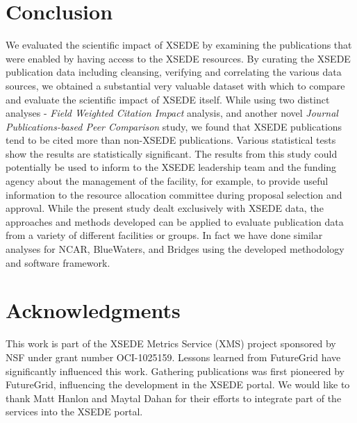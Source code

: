 \documentclass{sig-alternate}
\begin{document}
\section{Conclusion} \label{S:conclusion}

We evaluated the scientific impact of XSEDE by examining the
publications that were enabled by having access to the XSEDE
resources. By curating the XSEDE publication data including cleansing,
verifying and correlating the various data sources, we obtained a
substantial very valuable dataset with which to compare and evaluate
the scientific impact of XSEDE itself.  While using two distinct
analyses - \emph{Field Weighted Citation Impact} analysis, and another novel
\emph{Journal Publications-based Peer Comparison} study, we found that XSEDE
publications tend to be cited more than non-XSEDE publications.
Various statistical tests show the results are statistically
significant.  The results from this study could potentially be used to
inform to the XSEDE leadership team and the funding agency about the
management of the facility, for example, to provide useful information
to the resource allocation committee during proposal selection and
approval.  While the present study dealt exclusively with XSEDE data,
the approaches and methods developed can be applied to evaluate
publication data from a variety of different facilities or groups.  In
fact we have done similar analyses for NCAR, BlueWaters, and Bridges
using the developed methodology and software framework.


\section{Acknowledgments}

This work is part of the XSEDE Metrics Service (XMS) project sponsored
by NSF under grant number OCI-1025159. Lessons learned from FutureGrid
have significantly influenced this work. Gathering publications was
first pioneered by FutureGrid, influencing the development in the XSEDE
portal. We would like to thank Matt Hanlon and Maytal Dahan for their
efforts to integrate part of the services into the XSEDE portal.




\end{document}

